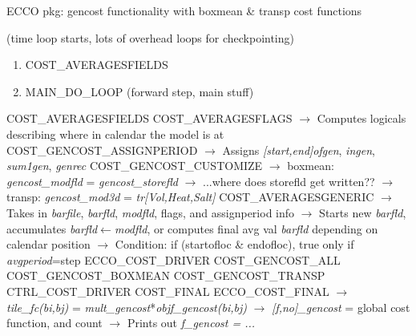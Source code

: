 \documentclass[a4paper,10pt]{article}
\newcommand{\ai}{\hspace{\algorithmicindent}}
\begin{document}
  \begin{algorithm}
  \caption{ECCO pkg: gencost functionality with boxmean \& transp cost functions}
  \begin{algorithmic}
   \label{alg:ecco2}
   \STATE (time loop starts, lots of overhead loops for checkpointing)
      \STATE 
	\begin{enumerate}
           \item COST\_AVERAGESFIELDS
           \item MAIN\_DO\_LOOP (forward step, main stuff)
        \end{enumerate}
   \ENDFOR
   \STATE\ai COST\_AVERAGESFIELDS
   \STATE\ai\ai COST\_AVERAGESFLAGS
   \STATE\ai\ai\ai $\rightarrow$ Computes logicals describing where in calendar the model is at
   \STATE\ai\ai COST\_GENCOST\_ASSIGNPERIOD
   \STATE\ai\ai\ai $\rightarrow$ Assigns \textit{[start,end]ofgen}, \textit{ingen}, \textit{sum1gen}, \textit{genrec}
   \STATE\ai\ai COST\_GENCOST\_CUSTOMIZE
   \STATE\ai\ai\ai $\rightarrow$ boxmean: \textit{gencost\_modfld} = \textit{gencost\_storefld}
   \STATE\ai\ai\ai $\rightarrow$ ...where does storefld get written??
   \STATE\ai\ai\ai $\rightarrow$ transp: \textit{gencost\_mod3d} = \textit{tr[Vol,Heat,Salt]}
   \STATE\ai\ai COST\_AVERAGESGENERIC
   \STATE\ai\ai\ai $\rightarrow$ Takes in \textit{barfile}, \textit{barfld}, \textit{modfld}, flags, and assignperiod info
   \STATE\ai\ai\ai $\rightarrow$ Starts new \textit{barfld}, accumulates \textit{barfld}$\leftarrow$\textit{modfld}, or computes final avg val \textit{barfld} 
   \STATE\ai\ai\ai depending on calendar position
   \STATE\ai\ai\ai $\rightarrow$ Condition: if (startofloc \& endofloc), true only if \textit{avgperiod}=step
   \STATE\ai ECCO\_COST\_DRIVER
   \STATE\ai\ai COST\_GENCOST\_ALL
   \STATE\ai\ai\ai COST\_GENCOST\_BOXMEAN
   \STATE\ai\ai\ai COST\_GENCOST\_TRANSP
   \STATE\ai\ai CTRL\_COST\_DRIVER
   \STATE COST\_FINAL
   \STATE\ai ECCO\_COST\_FINAL
   \STATE\ai\ai $\rightarrow$ \textit{tile\_fc(bi,bj)} = \textit{mult\_gencost}*\textit{objf\_gencost(bi,bj)}
   \STATE\ai\ai $\rightarrow$ \textit{[f,no]\_gencost} = global cost function, and count
   \STATE\ai\ai $\rightarrow$ Prints out \textit{f\_gencost = ...}
  \end{algorithmic}
\end{algorithm}
\end{document}

